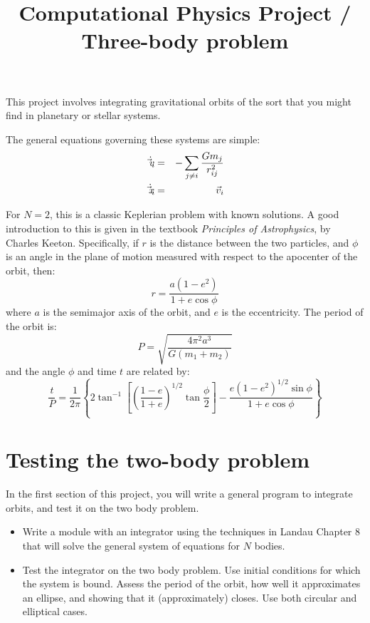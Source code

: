 \documentclass[11pt, preprint]{aastex}
\begin{document}
\title{\bf Computational Physics Project / Three-body problem}

This project involves integrating gravitational orbits of the sort
that you might find in planetary or stellar systems. 

The general equations governing these systems are simple:
\begin{eqnarray}
\dot{\vec{v}_i} &=& - \sum_{j \ne i} \frac{Gm_j}{r_{ij}^2} \cr
\dot{\vec{x}_i} &=& \vec{v}_i
\end{eqnarray}

For $N=2$, this is a classic Keplerian problem with known solutions.
A good introduction to this is given in the textbook {\it Principles
  of Astrophysics}, by Charles Keeton. Specifically, if $r$ is the
distance between the two particles, and $\phi$ is an angle in the
plane of motion measured with respect to the apocenter of the orbit,
then:
\begin{equation}
r = \frac{a(1-e^2)}{1+e \cos\phi}
\end{equation}
where $a$ is the semimajor axis of the orbit, and $e$ is the
eccentricity. The period of the orbit is:
\begin{equation}
P = \sqrt{\frac{4\pi^2 a^3}{G(m_1 + m_2)}}
\end{equation}
and the angle $\phi$ and time $t$ are related by:
\begin{equation}
  \frac{t}{P} = \frac{1}{2\pi}\left\{
    2\tan^{-1}\left[\left(\frac{1-e}{1+e}\right)^{1/2}
      \tan\frac{\phi}{2}\right]
    - \frac{e(1-e^2)^{1/2} \sin\phi}{1+e\cos\phi}\right\}
\end{equation}

\section{Testing the two-body problem}

In the first section of this project, you will write a general program
to integrate orbits, and test it on the two body problem.

\begin{itemize}
\item Write a module with an integrator using the techniques in Landau
  Chapter 8 that will solve the general system of equations for $N$
  bodies.
\item Test the integrator on the two body problem. Use initial
  conditions for which the system is bound. Assess the period of the
  orbit, how well it approximates an ellipse, and showing that it
  (approximately) closes. Use both circular and elliptical cases.
\end{itemize}
\end{document}

